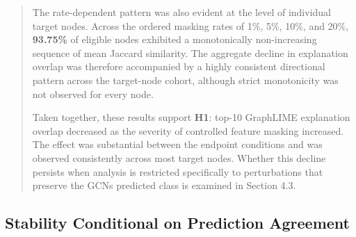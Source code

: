 \documentclass[a4paper]{article}
\begin{document}
\begin{quote}
The rate-dependent pattern was also evident at the level of individual
target nodes. Across the ordered masking rates of 1\%, 5\%, 10\%, and
20\%, \textbf{93.75\%} of eligible nodes exhibited a monotonically
non-increasing sequence of mean Jaccard similarity. The aggregate
decline in explanation overlap was therefore accompanied by a highly
consistent directional pattern across the target-node cohort, although
strict monotonicity was not observed for every node.

Taken together, these results support \textbf{H1}: top-10 GraphLIME
explanation overlap decreased as the severity of controlled feature
masking increased. The effect was substantial between the endpoint
conditions and was observed consistently across most target nodes.
Whether this decline persists when analysis is restricted specifically
to perturbations that preserve the GCN\textquotesingle s predicted class
is examined in Section 4.3.
\end{quote}

\subsection{\texorpdfstring{Stability Conditional on Prediction
Agreement
}{Stability Conditional on Prediction Agreement }}\label{stability-conditional-on-prediction-agreement}
\end{document}

